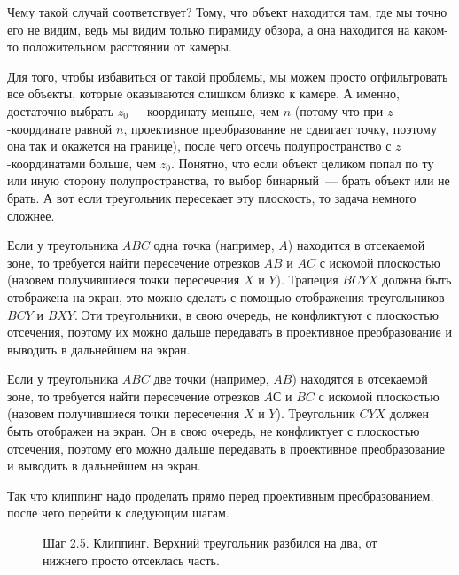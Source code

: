 \documentclass{article}
\begin{document}
Чему такой случай соответствует? Тому, что объект находится там, где мы точно его не видим, ведь мы видим только пирамиду обзора, а она находится на каком-то положительном расстоянии от камеры.

Для того, чтобы избавиться от такой проблемы, мы можем просто отфильтровать все объекты, которые оказываются слишком близко к камере. А именно, достаточно выбрать $z_0$~---координату меньше, чем $n$ (потому что при $z$-координате равной $n$, проективное преобразование не сдвигает точку, поэтому она так и окажется на границе), после чего отсечь полупространство с $z$-координатами больше, чем $z_0$. Понятно, что если объект целиком попал по ту или иную сторону полупространства, то выбор бинарный~--- брать объект или не брать. А вот если треугольник пересекает эту плоскость, то задача немного сложнее.

Если у треугольника $ABC$ одна точка (например, $A$) находится в отсекаемой зоне, то требуется найти пересечение отрезков $AB$ и $AC$ с искомой плоскостью (назовем получившиеся точки пересечения $X$ и $Y$). Трапеция $BCYX$ должна быть отображена на экран, это можно сделать с помощью отображения треугольников $BCY$ и $BXY$. Эти треугольники, в свою очередь, не конфликтуют с плоскостью отсечения, поэтому их можно дальше передавать в проективное преобразование и выводить в дальнейшем на экран.

Если у треугольника $ABC$ две точки (например, $AB$) находятся в отсекаемой зоне, то требуется найти пересечение отрезков $AС$ и $BC$ с искомой плоскостью (назовем получившиеся точки пересечения $X$ и $Y$). Треугольник $CYX$ должен быть отображен на экран. Он в свою очередь, не конфликтует с плоскостью отсечения, поэтому его можно дальше передавать в проективное преобразование и выводить в дальнейшем на экран.

Так что клиппинг надо проделать прямо перед проективным преобразованием, после чего перейти к следующим шагам.


\begin{center}
\begin{figure}[H]
\caption{Шаг 2.5. Клиппинг. Верхний треугольник разбился на два, от нижнего просто отсеклась часть.}
\label{ris:image}
\end{figure}
\end{center}
\end{document}
